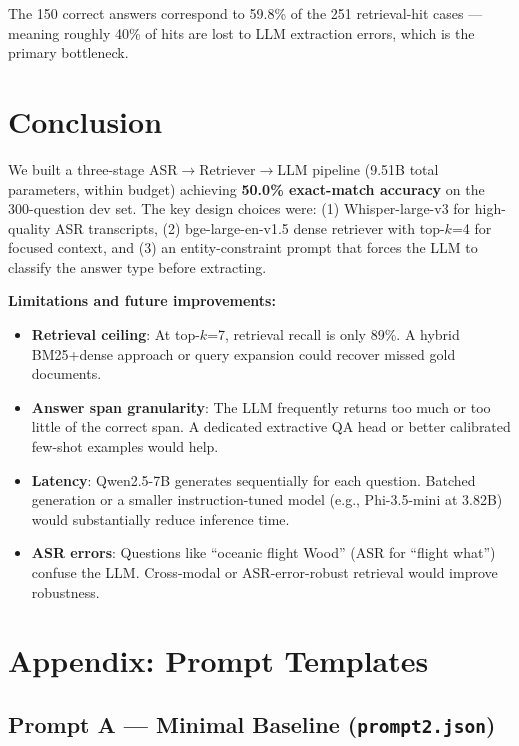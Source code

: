 \documentclass[11pt,a4paper]{article}
\begin{document}
The 150 correct answers correspond to 59.8\% of the 251 retrieval-hit cases — meaning roughly 40\% of hits are lost to LLM extraction errors, which is the primary bottleneck.

\section{Conclusion}

We built a three-stage ASR$\rightarrow$Retriever$\rightarrow$LLM pipeline (9.51B total parameters, within budget) achieving \textbf{50.0\% exact-match accuracy} on the 300-question dev set. The key design choices were: (1) Whisper-large-v3 for high-quality ASR transcripts, (2) bge-large-en-v1.5 dense retriever with top-$k$=4 for focused context, and (3) an entity-constraint prompt that forces the LLM to classify the answer type before extracting.

\textbf{Limitations and future improvements:}
\begin{itemize}[noitemsep,topsep=2pt]
  \item \textbf{Retrieval ceiling}: At top-$k$=7, retrieval recall is only 89\%. A hybrid BM25+dense approach or query expansion could recover missed gold documents.
  \item \textbf{Answer span granularity}: The LLM frequently returns too much or too little of the correct span. A dedicated extractive QA head or better calibrated few-shot examples would help.
  \item \textbf{Latency}: Qwen2.5-7B generates sequentially for each question. Batched generation or a smaller instruction-tuned model (e.g., Phi-3.5-mini at 3.82B) would substantially reduce inference time.
  \item \textbf{ASR errors}: Questions like ``oceanic flight Wood'' (ASR for ``flight what'') confuse the LLM. Cross-modal or ASR-error-robust retrieval would improve robustness.
\end{itemize}

\newpage
\section*{Appendix: Prompt Templates}

\subsection*{Prompt A — Minimal Baseline (\texttt{prompt2.json})}
\end{document}
